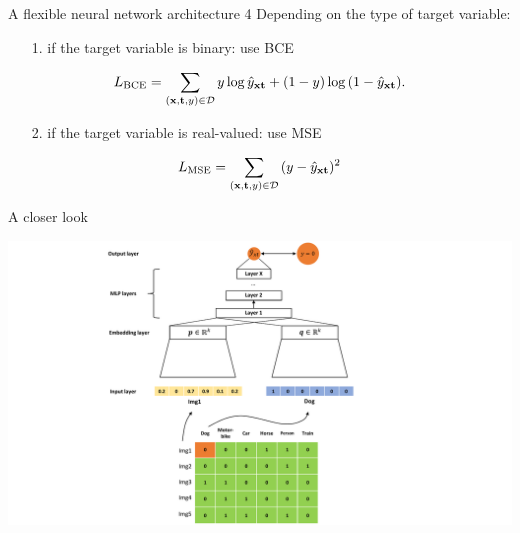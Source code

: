 \documentclass[]{beamer}
\begin{document}
\begin{frame}{A flexible neural network architecture 4}
Depending on the type of target variable:

\begin{itemize}
    \item[1.] if the target variable is binary: use BCE
\end{itemize}
\begin{equation}
    \uppercase{{L}}_{{\mathrm{BCE}}} = \sum_{({\mathbf{x}},{\mathbf{t}}, y) \in \mathcal{D}} {y} \log{\hat{y}_{\mathbf{xt}}} + (1 - y)\log{(1 - \hat{y}_{\mathbf{xt}}}).
\end{equation}

\begin{itemize}
    \item[2.] if the target variable is real-valued: use MSE
\end{itemize}
\begin{equation}
    \uppercase{{L}}_{{\mathrm{MSE}}} = \sum_{({\mathbf{x}},{\mathbf{t}}, y) \in \mathcal{D}} {(y - \hat{y}_{\mathbf{xt}})^2}
\end{equation}

\end{frame}


\begin{frame}{A closer look}

\begin{center}
\includegraphics[width=\textwidth,trim = 0 0 0 0,clip]{Dimitris_figures/dual_branch_NN_vertical_v2.pdf}
\end{center}

\end{frame}
\end{document}

